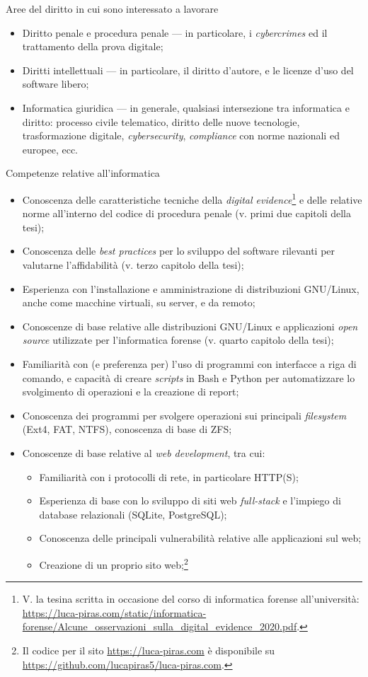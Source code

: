 \documentclass[12pt]{article}
\begin{document}
{\Large Aree del diritto in cui sono interessato a lavorare}

\begin{itemize}
\item Diritto penale e procedura penale --- in particolare, i \textit{cybercrimes} ed il trattamento della prova digitale;
\item Diritti intellettuali --- in particolare, il diritto d'autore, e le licenze d'uso del software libero;
\item Informatica giuridica --- in generale, qualsiasi intersezione tra informatica e diritto: processo civile telematico, diritto delle nuove tecnologie, trasformazione digitale, \textit{cybersecurity}, \textit{compliance} con norme nazionali ed europee, ecc.
\end{itemize}

{\Large Competenze relative all'informatica}

\begin{itemize}
\item Conoscenza delle caratteristiche tecniche della \textit{digital evidence}\footnote{V. la tesina scritta in occasione del corso di informatica forense all'università: \url{https://luca-piras.com/static/informatica-forense/Alcune_osservazioni_sulla_digital_evidence_2020.pdf}.} e delle relative norme all'interno del codice di procedura penale (v. primi due capitoli della tesi);
\item Conoscenza delle \textit{best practices} per lo sviluppo del software rilevanti per valutarne l'affidabilità (v. terzo capitolo della tesi);
\item Esperienza con l'installazione e amministrazione di distribuzioni GNU/Linux, anche come macchine virtuali, su server, e da remoto;
\item Conoscenze di base relative alle distribuzioni GNU/Linux e applicazioni \textit{open source} utilizzate per l'informatica forense (v. quarto capitolo della tesi);
\item Familiarità con (e preferenza per) l'uso di programmi con interfacce a riga di comando, e capacità di creare \textit{scripts} in Bash e Python per automatizzare lo svolgimento di operazioni e la creazione di report;
\item Conoscenza dei programmi per svolgere operazioni sui principali \textit{filesystem} (Ext4, FAT, NTFS), conoscenza di base di ZFS;
\item Conoscenze di base relative al \textit{web development}, tra cui:
  \begin{itemize}
  \item Familiarità con i protocolli di rete, in particolare HTTP(S);
  \item Esperienza di base con lo sviluppo di siti web \textit{full-stack} e l'impiego di database relazionali (SQLite, PostgreSQL);
  \item Conoscenza delle principali vulnerabilità relative alle applicazioni sul web;
  \item Creazione di un proprio sito web;\footnote{Il codice per il sito \url{https://luca-piras.com} è disponibile su \url{https://github.com/lucapiras5/luca-piras.com}.}
  \end{itemize}
\end{itemize}
\end{document}
